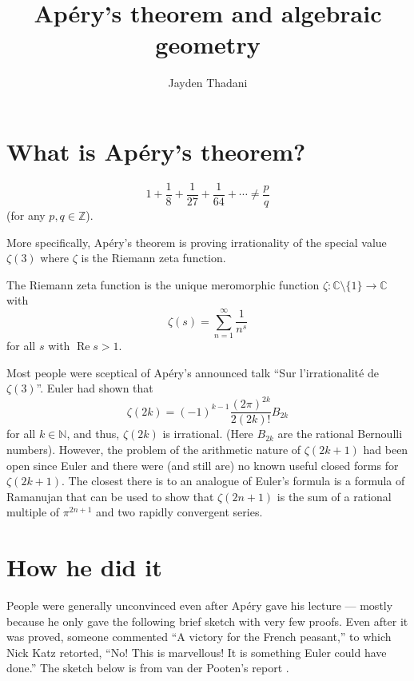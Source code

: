 \documentclass[12 pt, letterpaper]{amsart}
\title{Ap\'ery's theorem and algebraic geometry}
\author{Jayden Thadani}
\begin{document}
\maketitle

\section{What is Ap\'ery's theorem?}

\begin{theorem}
	\[
		1 + \frac{1}{8} + \frac{1}{27} + \frac{1}{64} + \cdots \neq \frac{p}{q}
	\]
	(for any $p, q \in \mathbb{Z}$).
\end{theorem}

More specifically, Ap\'ery's theorem is proving irrationality of the special value $\zeta(3)$ where $\zeta$ is the Riemann zeta function.

\begin{definition}
	The Riemann zeta function is the unique meromorphic function $\zeta : \mathbb{C} \setminus \{ 1 \} \to \mathbb{C}$ with
	\[
		\zeta(s) = \sum_{n = 1}^{\infty} \frac{1}{n^{s}}
	\]
	for all $s$ with $\operatorname{Re} s > 1$.
\end{definition}

Most people were sceptical of Ap\'ery's announced talk ``Sur l'irrationalit\'e de $\zeta(3)$''. Euler had shown that
\[
	\zeta(2k) = (-1)^{k - 1} \frac{(2 \pi)^{2k}}{2 (2k)!} B_{2k}
\]
for all $k \in \mathbb{N}$, and thus, $\zeta(2k)$ is irrational. (Here $B_{2k}$ are the rational Bernoulli numbers). However, the problem of the arithmetic nature of $\zeta(2k + 1)$ had been open since Euler and there were (and still are) no known useful closed forms for $\zeta(2k + 1)$. The closest there is to an analogue of Euler's formula is a formula of Ramanujan that can be used to show that $\zeta(2n + 1)$ is the sum of a rational multiple of $\pi^{2n + 1}$ and two rapidly convergent series.

\section{How he did it}

People were generally unconvinced even after Ap\'ery gave his lecture --- mostly because he only gave the following brief sketch with very few proofs. Even after it was proved, someone commented ``A victory for the French peasant,'' to which Nick Katz retorted, ``No! This is marvellous! It is something Euler could have done.'' The sketch below is from van der Pooten's report \cite{euler-missed-1979}.
\end{document}
